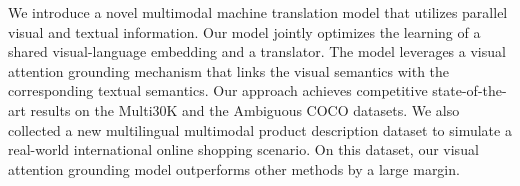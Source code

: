We introduce a novel multimodal machine translation model that utilizes parallel visual and textual information. Our model jointly optimizes the learning of a shared visual-language embedding and a translator. The model leverages a visual attention grounding mechanism that links the visual semantics with the corresponding textual semantics. Our approach achieves competitive state-of-the-art results on the Multi30K and the Ambiguous COCO datasets. We also collected a new multilingual multimodal product description dataset to simulate a real-world international online shopping scenario.  On this dataset, our visual attention grounding model outperforms other methods by a large margin.

